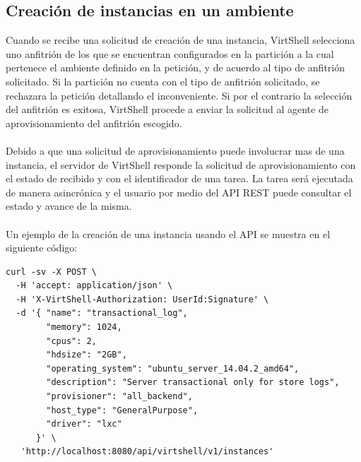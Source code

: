 \subsection{Creación de instancias en un ambiente}
Cuando se recibe una solicitud de creación de una instancia, VirtShell selecciona uno anfitrión de los que se encuentran configurados en la partición a la cual pertenece el ambiente definido en la petición, y de acuerdo al tipo de anfitrión solicitado. Si la partición no cuenta con el tipo de anfitrión solicitado, se rechazara la petición detallando el inconveniente. Si por el contrario la selección del anfitrión es exitosa, VirtShell procede a enviar la solicitud al agente de aprovisionamiento del anfitrión escogido. \\
\\
Debido a que una solicitud de aprovisionamiento puede involucrar mas de una instancia, el servidor de VirtShell responde la solicitud de aprovisionamiento con el estado de recibido y con el identificador de una tarea. La tarea será ejecutada de manera asincrónica y el usuario por medio del API REST puede consultar el estado y avance de la misma.\\
\\
Un ejemplo de la creación de una instancia usando el API se muestra en el siguiente código:

\begin{lstlisting}[style=json, caption=Petición HTTP para crear un ambiente]
curl -sv -X POST \
  -H 'accept: application/json' \
  -H 'X-VirtShell-Authorization: UserId:Signature' \
  -d '{ "name": "transactional_log",
        "memory": 1024,
        "cpus": 2,
        "hdsize": "2GB",
        "operating_system": "ubuntu_server_14.04.2_amd64",
        "description": "Server transactional only for store logs", 
        "provisioner": "all_backend",
        "host_type": "GeneralPurpose",
        "driver": "lxc"
      }' \
   'http://localhost:8080/api/virtshell/v1/instances'
\end{lstlisting}



